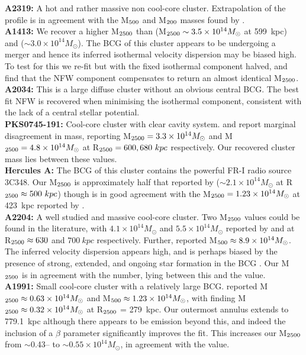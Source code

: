 \documentclass[twocolumn]{aastex6}
\begin{document}
{\bf A2319:} A hot and rather massive non cool-core cluster.  Extrapolation of the profile is in agreement with the M$_{\rm 500}$ and M$_{\rm 200}$ masses found by \citet[][]{Reiprich02}. \\
{\bf A1413:} We recover a higher M$_{\rm 2500}$ than \citet[][]{Allen08} (M$_{\rm 2500}\sim3.5\times10^{14}M_{\odot}$ at 599~kpc) and \citet[][]{Vikhlinin06} ($\sim3.0\times10^{14}M_{\odot}$).  The BCG of this cluster appears to be undergoing a merger and hence its inferred isothermal velocity dispersion may be biased high.  To test for this we re-fit but with the fixed isothermal component halved, and find that the NFW component compensates to return an almost identical M$_{\rm 2500}$. \\
{\bf A2034:} This is a large diffuse cluster without an obvious central BCG.  The best fit NFW is recovered when minimising the isothermal component, consistent with the lack of a central stellar potential. \\
{\bf PKS0745-191:} Cool-core cluster with clear cavity system.  \citet[][]{Main17} and \citet[][]{Allen08} report marginal disagreement in mass, reporting M$_{\rm 2500} = 3.3\times10^{14}M_{\odot}$ and M$_{\rm 2500} = 4.8\times10^{14}M_{\odot}$ at R$_{\rm 2500} = 600, 680~kpc$ respectively.  Our recovered cluster mass lies between these values. \\
{\bf Hercules A:} The BCG of this cluster contains the powerful FR-I radio source 3C348.  Our M$_{\rm 2500}$ is approximately half that reported by \citet[][]{Main17} ($\sim2.1\times10^{14}M_{\odot}$ at R$_{\rm 2500} \approx 500~kpc$) though is in good agreement with the M$_{\rm 2500} = 1.23\times10^{14}M_{\odot}$ at 423~kpc reported by \citet[][]{Comis11}. \\
{\bf A2204:}  A well studied and massive cool-core cluster.  Two M$_{\rm 2500}$ values could be found in the literature, with $4.1\times10^{14}M_{\odot}$ and $5.5\times10^{14}M_{\odot}$ reported by \citet[][]{Allen08} and \citet[][]{Main17} at R$_{\rm 2500} \approx 630$ and $700~kpc$ respectively.  Further, \citet[][]{Vikhlinin09} reported M$_{\rm 500} \approx 8.9\times10^{14}M_{\odot}$.  The inferred velocity dispersion appears high, and is perhaps biased by the presence of strong, extended, and ongoing star formation in the BCG \citet[][]{Oonk11}.  Our M$_{\rm 2500}$ is in agreement with the \citet[][]{Allen08} number, lying between this and the \citet[][]{Main17} value. \\
{\bf A1991:} Small cool-core cluster with a relatively large BCG.  \citet[][]{Vikhlinin06} reported M$_{\rm 2500} \approx 0.63\times10^{14}M_{\odot}$ and M$_{\rm 500} \approx 1.23\times10^{14}M_{\odot}$, with \citet[][]{Comis11} finding M$_{\rm 2500} \approx 0.32\times10^{14}M_{\odot}$ at R$_{\rm 2500}$ = 279~kpc.  Our outermost annulus extends to 779.1~kpc although there appears to be emission beyond this, and indeed the inclusion of a $\beta$ parameter significantly improves the fit.  This increases our M$_{\rm 2500}$ from $\sim$0.43-- to $\sim0.55\times10^{14}M_{\odot}$, in agreement with the \citet[][]{Vikhlinin06} value. \\
\end{document}
